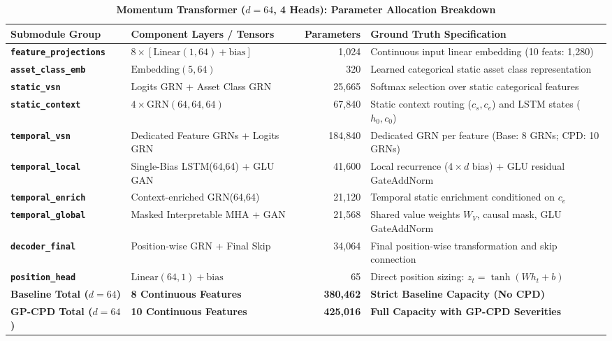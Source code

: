 \documentclass[11pt,a4paper]{article}
\begin{document}
\begin{table}[H]
\centering
\small
\caption{\textbf{Momentum Transformer ($d=64$, 4 Heads): Parameter Allocation Breakdown}}
\label{tab:model_params}
\vspace{0.4em}
\begin{tabularx}{\textwidth}{l l r X}
\toprule
\textbf{Submodule Group} & \textbf{Component Layers / Tensors} & \textbf{Parameters} & \textbf{Ground Truth Specification} \\
\midrule
\textbf{\texttt{feature\_projections}} & $8 \times [\text{Linear}(1, 64) + \text{bias}]$ & 1,024 & Continuous input linear embedding (10 feats: 1,280) \\
\textbf{\texttt{asset\_class\_emb}} & $\text{Embedding}(5, 64)$ & 320 & Learned categorical static asset class representation \\
\textbf{\texttt{static\_vsn}} & Logits GRN + Asset Class GRN & 25,665 & Softmax selection over static categorical features \\
\textbf{\texttt{static\_context}} & $4 \times \text{GRN}(64, 64, 64)$ & 67,840 & Static context routing ($c_s, c_e$) and LSTM states ($h_0, c_0$) \\
\textbf{\texttt{temporal\_vsn}} & Dedicated Feature GRNs + Logits GRN & 184,840 & Dedicated GRN per feature (Base: 8 GRNs; CPD: 10 GRNs) \\
\textbf{\texttt{temporal\_local}} & Single-Bias LSTM(64,64) + GLU GAN & 41,600 & Local recurrence ($4 \times d$ bias) + GLU residual GateAddNorm \\
\textbf{\texttt{temporal\_enrich}} & Context-enriched GRN(64,64) & 21,120 & Temporal static enrichment conditioned on $c_e$ \\
\textbf{\texttt{temporal\_global}} & Masked Interpretable MHA + GAN & 21,568 & Shared value weights $W_V$, causal mask, GLU GateAddNorm \\
\textbf{\texttt{decoder\_final}} & Position-wise GRN + Final Skip & 34,064 & Final position-wise transformation and skip connection \\
\textbf{\texttt{position\_head}} & $\text{Linear}(64, 1) + \text{bias}$ & 65 & Direct position sizing: $z_t = \tanh(W h_t + b)$ \\
\midrule
\textbf{Baseline Total ($d=64$)} & \textbf{8 Continuous Features} & \textbf{380,462} & \textbf{Strict Baseline Capacity (No CPD)} \\
\textbf{GP-CPD Total ($d=64$)} & \textbf{10 Continuous Features} & \textbf{425,016} & \textbf{Full Capacity with GP-CPD Severities} \\
\bottomrule
\end{tabularx}
\end{table}
\end{document}
